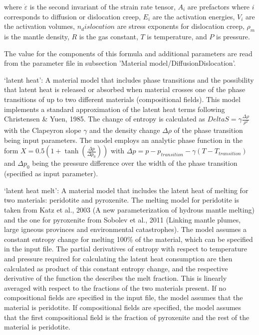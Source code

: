 \begin{itemize}
 where $\dot{\varepsilon}$ is the second invariant of the strain rate tensor, $A_i$ are prefactors where $i$ corresponds to diffusion or dislocation creep, $E_i$ are the activation energies, $V_i$ are the activation volumes, $n_dislocation$ are stress exponents for dislocation creep, $\rho_m$ is the mantle density, $R$ is the gas constant, $T$ is temperature, and $P$ is pressure. 

 The value for the components of this formula and additional parameters are read from the parameter file in subsection 'Material model/DiffusionDislocation'.

`latent heat': A material model that includes phase transitions and the possibility that latent heat is released or absorbed when material crosses one of the phase transitions of up to two different materials (compositional fields). This model implements a standard approximation of the latent heat terms following Christensen \& Yuen, 1985. The change of entropy is calculated as $Delta S = \gamma \frac{\Delta\rho}{\rho^2}$ with the Clapeyron slope $\gamma$ and the density change $\Delta\rho$ of the phase transition being input parameters. The model employs an analytic phase function in the form $X=0.5 \left( 1 + \tanh \left( \frac{\Delta p}{\Delta p_0} \right) \right)$ with $\Delta p = p - p_{transition} - \gamma \left( T - T_{transition} \right)$ and $\Delta p_0$ being the pressure difference over the width of the phase transition (specified as input parameter).

`latent heat melt': A material model that includes the latent heat of melting for two materials: peridotite and pyroxenite. The melting model for peridotite is taken from Katz et al., 2003 (A new parameterization of hydrous mantle melting) and the one for pyroxenite from Sobolev et al., 2011 (Linking mantle plumes, large igneous provinces and environmental catastrophes). The model assumes a constant entropy change for melting 100\% of the material, which can be specified in the input file. The partial derivatives of entropy with respect to temperature and pressure required for calculating the latent heat consumption are then calculated as product of this constant entropy change, and the respective derivative of the function the describes the melt fraction. This is linearly averaged with respect to the fractions of the two materials present. If no compositional fields are specified in the input file, the model assumes that the material is peridotite. If compositional fields are specified, the model assumes that the first compositional field is the fraction of pyroxenite and the rest of the material is peridotite. 


\end{itemize}
